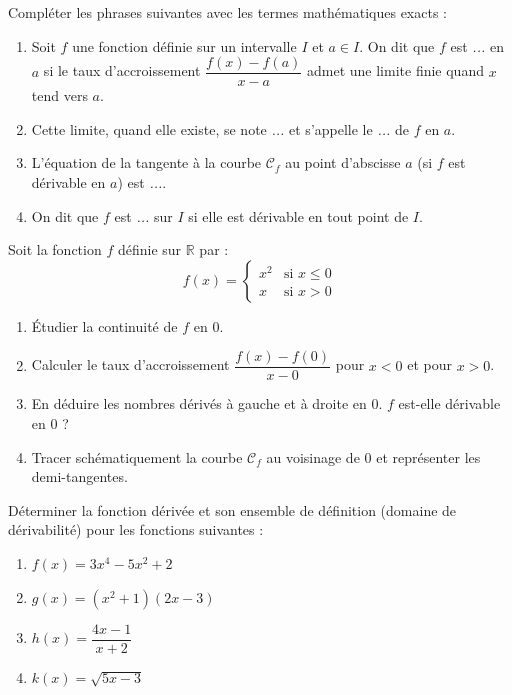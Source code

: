 \documentclass[11pt]{article}
\newcounter{popsec}
\newcounter{popsub}
\newcommand{\courssub}[1]{%
  \stepcounter{popsub}%
  \par\vspace{9pt}\noindent{\popxbold\fontsize{11.5}{13}\selectfont\color{popink}{\color{poporange}\thepopsec.\thepopsub}\hspace{6pt}#1}\par\nopagebreak\vspace{4pt}
}
\begin{document}
\begin{exercice}
Compléter les phrases suivantes avec les termes mathématiques exacts :
\begin{enumerate}
    \item Soit $f$ une fonction définie sur un intervalle $I$ et $a\in I$. On dit que $f$ est \emph{...} en $a$ si le taux d'accroissement $\dfrac{f(x)-f(a)}{x-a}$ admet une limite finie quand $x$ tend vers $a$.
    \item Cette limite, quand elle existe, se note \emph{...} et s'appelle le \emph{...} de $f$ en $a$.
    \item L'équation de la tangente à la courbe $\mathcal{C}_f$ au point d'abscisse $a$ (si $f$ est dérivable en $a$) est \emph{...}.
    \item On dit que $f$ est \emph{...} sur $I$ si elle est dérivable en tout point de $I$.
\end{enumerate}
\end{exercice}

\courssub{Je m'entraîne}

\begin{exercice}
Soit la fonction $f$ définie sur $\mathbb{R}$ par :
\[
f(x) = \begin{cases}
x^2 & \text{si } x \le 0 \\
x   & \text{si } x > 0
\end{cases}
\]
\begin{enumerate}
    \item Étudier la continuité de $f$ en $0$.
    \item Calculer le taux d'accroissement $\dfrac{f(x)-f(0)}{x-0}$ pour $x<0$ et pour $x>0$.
    \item En déduire les nombres dérivés à gauche et à droite en $0$. $f$ est-elle dérivable en $0$ ?
    \item Tracer schématiquement la courbe $\mathcal{C}_f$ au voisinage de $0$ et représenter les demi-tangentes.
\end{enumerate}
\end{exercice}

\begin{exercice}
Déterminer la fonction dérivée et son ensemble de définition (domaine de dérivabilité) pour les fonctions suivantes :
\begin{enumerate}
    \item $f(x) = 3x^4 - 5x^2 + 2$
    \item $g(x) = (x^2 + 1)(2x - 3)$
    \item $h(x) = \dfrac{4x - 1}{x + 2}$
    \item $k(x) = \sqrt{5x - 3}$
\end{enumerate}
\end{exercice}
\end{document}
